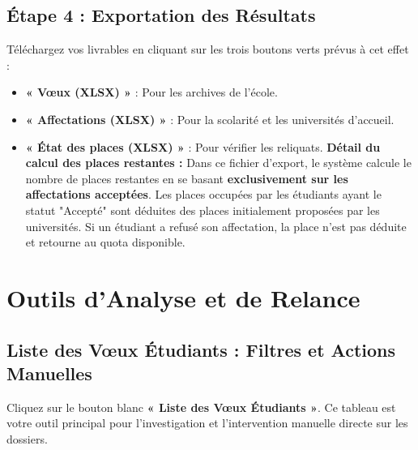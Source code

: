 \documentclass[12pt,a4paper]{article}
\begin{document}
\subsection{Étape 4 : Exportation des Résultats}
Téléchargez vos livrables en cliquant sur les trois boutons verts prévus à cet effet :
\begin{itemize}[leftmargin=*]
    \item \textbf{« Vœux (XLSX) »} : Pour les archives de l'école.
    \item \textbf{« Affectations (XLSX) »} : Pour la scolarité et les universités d'accueil.
    \item \textbf{« État des places (XLSX) »} : Pour vérifier les reliquats.
    \newline \textbf{Détail du calcul des places restantes :} Dans ce fichier d'export, le système calcule le nombre de places restantes en se basant \textbf{exclusivement sur les affectations acceptées}. Les places occupées par les étudiants ayant le statut "Accepté" sont déduites des places initialement proposées par les universités. Si un étudiant a refusé son affectation, la place n'est pas déduite et retourne au quota disponible.
\end{itemize}

\section{Outils d'Analyse et de Relance}

\subsection{Liste des Vœux Étudiants : Filtres et Actions Manuelles}
Cliquez sur le bouton blanc \textbf{« Liste des Vœux Étudiants »}. Ce tableau est votre outil principal pour l'investigation et l'intervention manuelle directe sur les dossiers.
\end{document}
